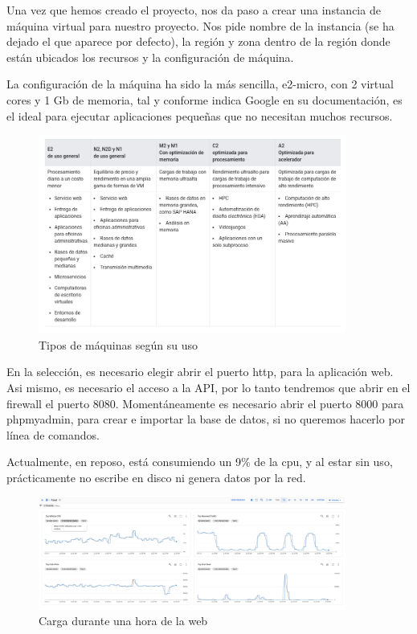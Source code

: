 \documentclass[11pt,spanish,listoffigures,listoftables]{tfgetsinf}
\begin{document}
Una vez que hemos creado el proyecto, nos da paso a crear una instancia de máquina virtual para nuestro proyecto. 
Nos pide nombre de la instancia (se ha dejado el que aparece por defecto), la región y zona dentro de la región donde están ubicados los recursos y la configuración de máquina.

La configuración de la máquina ha sido la más sencilla, e2-micro, con 2 virtual cores y 1 Gb de memoria, tal y conforme indica Google en su documentación, es el ideal para ejecutar aplicaciones pequeñas que no necesitan muchos recursos.

\begin{figure}[h!] %
  \centering
   \includegraphics[width=0.90\textwidth]{img/cargas de trabajo.png}
   \caption{Tipos de máquinas según su uso}
   \label{fig:cargas}
 \end{figure}

 En la selección, es necesario elegir abrir el puerto http, para la aplicación web. Asi mismo, es necesario el acceso a la API, por lo tanto tendremos que abrir en el firewall el puerto 8080. 
 Momentáneamente es necesario abrir el puerto 8000 para phpmyadmin, para crear e importar la base de datos, si no queremos hacerlo por línea de comandos.

 Actualmente, en reposo, está consumiendo un 9\% de la cpu, y al estar sin uso, prácticamente no escribe en disco ni genera datos por la red.

 \begin{figure}[h!] %
  \centering
   \includegraphics[width=0.90\textwidth]{img/cargaGoogleCloud.png}
   \caption{Carga durante una hora de la web}
   \label{fig:cargaweb}
 \end{figure}
\end{document}
